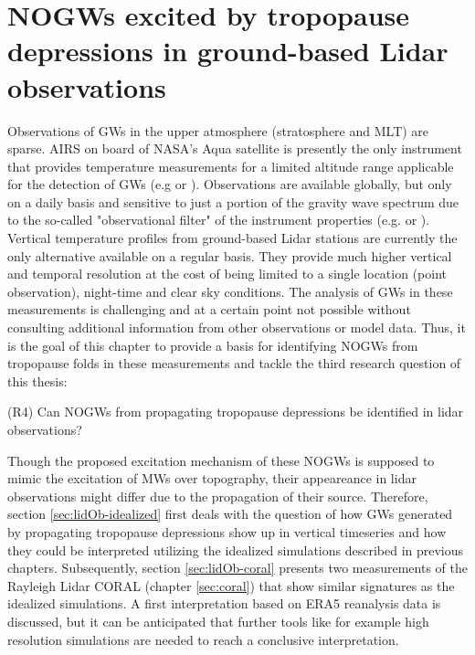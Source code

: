 \chapter{NOGWs excited by tropopause depressions in ground-based Lidar observations}

Observations of GWs in the upper atmosphere (stratosphere and MLT) are sparse. AIRS on board of NASA’s Aqua satellite is presently the only instrument that provides temperature measurements for a limited altitude range applicable for the detection of GWs (e.g \cite[]{hindley_gravity_2019} or \cite[]{hindley_18year_2020}). Observations are available globally, but only on a daily basis and sensitive to just a portion of the gravity wave spectrum due to the so-called "observational filter" of the instrument properties (e.g. \cite[]{preusse_space-based_2002} or \cite[]{alexander_recent_2010}). Vertical temperature profiles from ground-based Lidar stations are currently the only alternative available on a regular basis. They provide much higher vertical and temporal resolution at the cost of being limited to a single location (point observation), night-time and clear sky conditions. The analysis of GWs in these measurements is challenging and at a certain point not possible without consulting additional information from other observations or model data. Thus, it is the goal of this chapter to provide a basis for identifying NOGWs from tropopause folds in these measurements and tackle the third research question of this thesis:

\begin{tcolorbox}[]
    (R4) Can NOGWs from propagating tropopause depressions be identified in lidar observations?
\end{tcolorbox}
Though the proposed excitation mechanism of these NOGWs is supposed to mimic the excitation of MWs over topography, their appeareance in lidar observations might differ due to the propagation of their source. Therefore, section \ref{sec:lidOb-idealized} first deals with the question of how GWs generated by propagating tropopause depressions show up in vertical timeseries and how they could be interpreted utilizing the idealized simulations described in previous chapters.
Subsequently, section \ref{sec:lidOb-coral} presents two measurements of the Rayleigh Lidar CORAL (chapter \ref{sec:coral}) that show similar signatures as the idealized simulations. A first interpretation based on ERA5 reanalysis data is discussed, but it can be anticipated that further tools like for example high resolution simulations are needed to reach a conclusive interpretation. 


